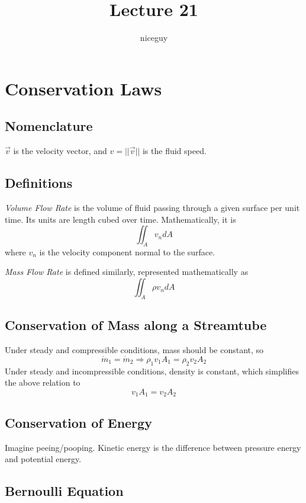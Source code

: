 \documentclass[12pt]{article}
\author{niceguy}
\title{Lecture 21}
\begin{document}
\maketitle

\section{Conservation Laws}

\subsection{Nomenclature}

$\vec{v}$ is the velocity vector, and $v = ||\vec{v}||$ is the fluid speed.

\subsection{Definitions}

\begin{defn}
	\emph{Volume Flow Rate} is the volume of fluid passing through a given surface per unit time. Its units are length cubed over time. Mathematically, it is
	$$\iint_A v_ndA$$
	where $v_n$ is the velocity component normal to the surface.
\end{defn}

\begin{defn}
	\emph{Mass Flow Rate} is defined similarly, represented mathematically as
	$$\iint_A \rho v_ndA$$
\end{defn}

\subsection{Conservation of Mass along a Streamtube}

Under steady and compressible conditions, mass should be constant, so
$$\dot{m}_1 = \dot{m}_2 \Rightarrow \rho_1v_1A_1 = \rho_2v_2A_2$$
Under steady and incompressible conditions, density is constant, which simplifies the above relation to
$$v_1A_1 = v_2A_2$$

\subsection{Conservation of Energy}

Imagine peeing/pooping. Kinetic energy is the difference between pressure energy and potential energy.

\subsection{Bernoulli Equation}
\end{document}
